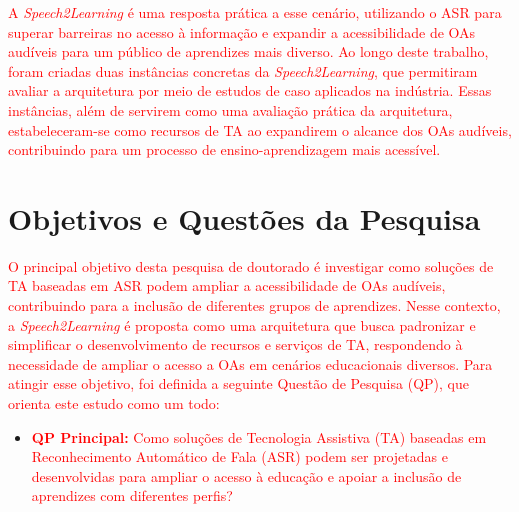 \textcolor{red}{A \textit{Speech2Learning} é uma resposta prática a esse cenário, utilizando o ASR para superar barreiras no acesso à informação e expandir a acessibilidade de OAs audíveis para um público de aprendizes mais diverso. Ao longo deste trabalho, foram criadas duas instâncias concretas da \textit{Speech2Learning}, que permitiram avaliar a arquitetura por meio de estudos de caso aplicados na indústria. Essas instâncias, além de servirem como uma avaliação prática da arquitetura, estabeleceram-se como recursos de TA ao expandirem o alcance dos OAs audíveis, contribuindo para um processo de ensino-aprendizagem mais acessível.}

\section{Objetivos e Questões da Pesquisa}
\label{chapter1:research-questions}

\textcolor{red}{O principal objetivo desta pesquisa de doutorado é investigar como soluções de TA baseadas em ASR podem ampliar a acessibilidade de OAs audíveis, contribuindo para a inclusão de diferentes grupos de aprendizes. Nesse contexto, a \textit{Speech2Learning} é proposta como uma arquitetura que busca padronizar e simplificar o desenvolvimento de recursos e serviços de TA, respondendo à necessidade de ampliar o acesso a OAs em cenários educacionais diversos. Para atingir esse objetivo, foi definida a seguinte Questão de Pesquisa (QP), que orienta este estudo como um todo:}

\begin{itemize}
\item \textcolor{red}{\textbf{QP Principal:} Como soluções de Tecnologia Assistiva (TA) baseadas em Reconhecimento Automático de Fala (ASR) podem ser projetadas e desenvolvidas para ampliar o acesso à educação e apoiar a inclusão de aprendizes com diferentes perfis?}
\end{itemize}

